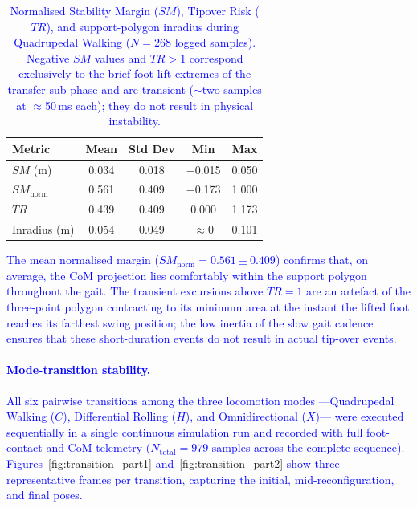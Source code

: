 \documentclass[preprint,12pt]{elsarticle}
\newcommand{\revblue}[1]{\textcolor{blue}{#1}}
\begin{document}
\begin{table}[t]
\centering
\caption{%
    \revblue{Normalised Stability Margin ($SM$), Tipover Risk ($TR$), and
    support-polygon inradius during Quadrupedal Walking
    ($N = 268$ logged samples).
    Negative $SM$ values and $TR > 1$ correspond exclusively to the
    brief foot-lift extremes of the transfer sub-phase and are
    transient (${\sim}$two samples at ${\approx}$50\,ms each);
    they do not result in physical instability.}%
}
\label{tab:crawl_stability}
\begin{tabular}{lcccc}
\toprule
\textbf{Metric} & \textbf{Mean} & \textbf{Std Dev} &
\textbf{Min} & \textbf{Max} \\
\midrule
$SM$ (m)       & 0.034 & 0.018 & $-$0.015 & 0.050 \\
$SM_{\mathrm{norm}}$ & 0.561 & 0.409 & $-$0.173 & 1.000 \\
$TR$           & 0.439 & 0.409 & 0.000   & 1.173 \\
Inradius (m)   & 0.054 & 0.049 & $\approx 0$ & 0.101 \\
\bottomrule
\end{tabular}
\end{table}

\revblue{%
The mean normalised margin ($SM_{\mathrm{norm}} = 0.561 \pm 0.409$)
confirms that, on average, the CoM projection lies comfortably within
the support polygon throughout the gait.
The transient excursions above $TR = 1$ are an artefact of the
three-point polygon contracting to its minimum area at the instant
the lifted foot reaches its farthest swing position; the low inertia
of the slow gait cadence ensures that these short-duration events
do not result in actual tip-over events.
}

\paragraph{\revblue{Mode-transition stability.}}

\revblue{%
All six pairwise transitions among the three locomotion
modes ---Quadrupedal Walking ($C$), Differential Rolling ($H$),
and Omnidirectional ($X$)--- were executed sequentially in a
single continuous simulation run and recorded with full
foot-contact and CoM telemetry ($N_{\mathrm{total}} = 979$ samples
across the complete sequence).
Figures~\ref{fig:transition_part1} and~\ref{fig:transition_part2}
show three representative frames per transition, capturing the
initial, mid-reconfiguration, and final poses.
}
\end{document}
